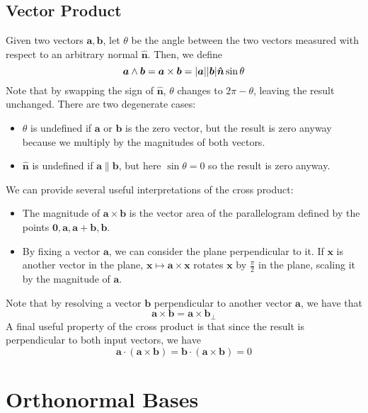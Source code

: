 \documentclass{article}
\begin{document}
	\subsection{Vector Product}
	\begin{definition}
		Given two vectors $\bm a, \bm b$, let $\theta$ be the angle between the two vectors measured with respect to an arbitrary normal $\bm{\hat n}$. Then, we define
		\[ \bm a \wedge \bm b = \bm a \times \bm b = \abs{\bm a} \abs{\bm b} \bm{\hat n} \sin \theta \]
		Note that by swapping the sign of $\bm{\hat n}$, $\theta$ changes to $2 \pi - \theta$, leaving the result unchanged. There are two degenerate cases:
		\begin{itemize}
			\item $\theta$ is undefined if $\bm a$ or $\bm b$ is the zero vector, but the result is zero anyway because we multiply by the magnitudes of both vectors.
			\item $\bm{\hat n}$ is undefined if $\bm a \parallel \bm b$, but here $\sin \theta = 0$ so the result is zero anyway.
		\end{itemize}
	\end{definition}
	We can provide several useful interpretations of the cross product:
	\begin{itemize}
		\item The magnitude of $\bm a \times \bm b$ is the vector area of the parallelogram defined by the points $\bm 0, \bm a, \bm a + \bm b, \bm b$.
		\item By fixing a vector $\bm a$, we can consider the plane perpendicular to it. If $\bm x$ is another vector in the plane, $\bm x \mapsto \bm a \times \bm x$ rotates $\bm x$ by $\frac{\pi}{2}$ in the plane, scaling it by the magnitude of $\bm a$.
	\end{itemize}
	Note that by resolving a vector $\bm b$ perpendicular to another vector $\bm a$, we have that
	\[ \bm a \times \bm b = \bm a \times \bm b_\perp \]
	A final useful property of the cross product is that since the result is perpendicular to both input vectors, we have
	\[ \bm a \cdot (\bm a \times \bm b) = \bm b \cdot(\bm a \times \bm b) = 0 \]
	
	\section{Orthonormal Bases}
\end{document}
